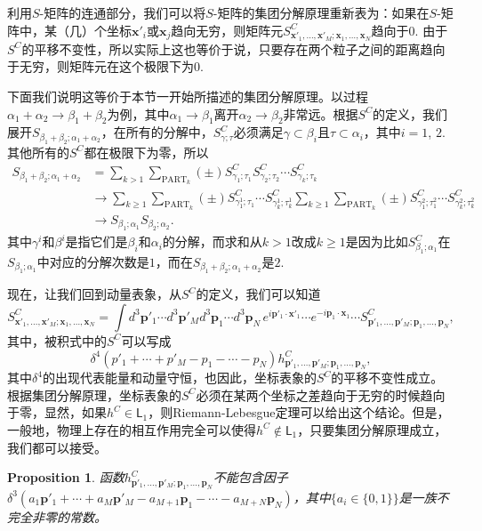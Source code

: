 \documentclass[11pt]{article}
\theoremstyle{definition}
\theoremstyle{plain}
\newtheorem{pro}[para]{Proposition}
\begin{document}
利用$S$-矩阵的连通部分，我们可以将$S$-矩阵的集团分解原理重新表为：如果在$S$-矩阵中，某（几）个坐标$\bm{x}'_i$或$\bm{x}_j$趋向无穷，则矩阵元$S^C_{\bm{x}'_1,\dots,\bm{x}'_M;\bm{x}_1,\dots,\bm{x}_N}$趋向于$0$. 由于$S^C$的平移不变性，所以实际上这也等价于说，只要存在两个粒子之间的距离趋向于无穷，则矩阵元在这个极限下为$0$. 

下面我们说明这等价于本节一开始所描述的集团分解原理。以过程$\alpha_1+\alpha_2\to \beta_1+\beta_2$为例，其中$\alpha_1\to \beta_1$离开$\alpha_2\to \beta_2$非常远。根据$S^C$的定义，我们展开$S_{\beta_1+\beta_2;\alpha_1+\alpha_2}$，在所有的分解中，$S^C_{\gamma;\tau}$必须满足$\gamma\subset \beta_i$且$\tau\subset \alpha_i$，其中$i=1$, $2$. 其他所有的$S^C$都在极限下为零，所以
\begin{align*}
S_{\beta_1+\beta_2;\alpha_1+\alpha_2}&=\sum_{k>1}\sum_{\text{PART}_k} (\pm) S^C_{\gamma_1;\tau_1}S^C_{\gamma_2;\tau_2}\cdots S^C_{\gamma_k;\tau_k}\\
&\to \sum_{k\geq 1}\sum_{\text{PART}_k} (\pm) S^C_{\gamma^1_1;\tau_1}\cdots S^C_{\gamma^1_k;\tau^1_k}\sum_{k\geq 1}\sum_{\text{PART}_k} (\pm) S^C_{\gamma^2_1;\tau^2_1}\cdots S^C_{\gamma^2_k;\tau^2_k}\\
&\to S_{\beta_1;\alpha_1}S_{\beta_2;\alpha_2}.
\end{align*}
其中$\gamma^i$和$\beta^i$是指它们是$\beta_i$和$\alpha_i$的分解，而求和从$k>1$改成$k\geq 1$是因为比如$S^C_{\beta_1;\alpha_1}$在$S_{\beta_1;\alpha_1}$中对应的分解次数是$1$，而在$S_{\beta_1+\beta_2;\alpha_1+\alpha_2}$是$2$.

现在，让我们回到动量表象，从$S^C$的定义，我们可以知道
\[
	S^C_{\bm{x}'_1,\dots,\bm{x}'_M;\bm{x}_1,\dots,\bm{x}_N}=\int d^3\bm{p}'_1\cdots d^3\bm{p}'_M d^3\bm{p}_1\cdots d^3\bm{p}_N \,e^{i\bm{p}'_1\cdot \bm{x}'_1}\cdots e^{-i\bm{p}_1\cdot \bm{x}_1}\cdots S^C_{\bm{p}'_1,\dots,\bm{p}'_M;\bm{p}_1,\dots,\bm{p}_N},
\]
其中，被积式中的$S^C$可以写成
\[
	\delta^4(p'_1+\cdots+p'_M-p_1-\cdots-p_N)h^C_{\bm{p}'_1,\dots,\bm{p}'_M;\bm{p}_1,\dots,\bm{p}_N},
\]
其中$\delta^4$的出现代表能量和动量守恒，也因此，坐标表象的$S^C$的平移不变性成立。根据集团分解原理，坐标表象的$S^C$必须在某两个坐标之差趋向于无穷的时候趋向于零，显然，如果$h^C\in \mathsf{L}_1$，则Riemann-Lebesgue定理可以给出这个结论。但是，一般地，物理上存在的相互作用完全可以使得$h^C\not\in \mathsf{L}_1$，只要集团分解原理成立，我们都可以接受。

\begin{pro}
函数$h^C_{\bm{p}'_1,\dots,\bm{p}'_M;\bm{p}_1,\dots,\bm{p}_N}$不能包含因子$\delta^3(a_1\bm{p}'_1+\cdots +a_M\bm{p}'_M-a_{M+1}\bm{p}_1-\cdots -a_{M+N}\bm{p}_N)$，其中$\{a_i\in\{0,1\}\}$是一族不完全非零的常数。
\end{pro}
\end{document}
